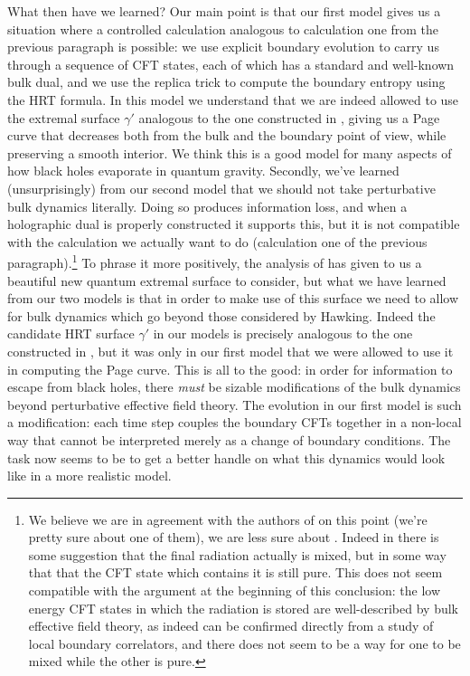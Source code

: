 \documentclass[12pt]{article}
\theoremstyle{definition}
\begin{document}
What then have we learned?  Our main point is that our first model gives us a situation where a controlled calculation analogous to calculation one from the previous paragraph is possible: we use explicit boundary evolution to carry us through a sequence of CFT states, each of which has a standard and well-known bulk dual, and we use the replica trick to compute the boundary entropy using the HRT formula.  In this model we understand that we are indeed allowed to use the extremal surface $\gamma'$ analogous to the one constructed in \cite{Almheiri:2019psf,Penington:2019npb}, giving us a Page curve that decreases both from the bulk and the boundary point of view, while preserving a smooth interior. We think this is a good model for many aspects of how black holes evaporate in quantum gravity.   Secondly, we've learned (unsurprisingly) from our second model that we should not take perturbative bulk dynamics literally.  Doing so produces information loss, and when a holographic dual is properly constructed it supports this, but it is not compatible with the calculation we actually want to do (calculation one of the previous paragraph).\footnote{We believe we are in agreement with the authors of \cite{Almheiri:2019psf} on this point (we're pretty sure about one of them), we are less sure about \cite{Penington:2019npb}.  Indeed in \cite{Penington:2019npb} there is some suggestion that the final radiation actually is mixed, but in some way that that the CFT state which contains it is still pure.  This does not seem compatible with the argument at the beginning of this conclusion: the low energy CFT states in which the radiation is stored are well-described by bulk effective field theory, as indeed can be confirmed directly from a study of local boundary correlators, and there does not seem to be a way for one to be mixed while the other is pure.}  To phrase it more positively, the analysis of \cite{Almheiri:2019psf,Penington:2019npb,Almheiri:2019hni} has given to us a beautiful new quantum extremal surface to consider, but what we have learned from our two models is that in order to make use of this surface we need to allow for bulk dynamics which go beyond those considered by Hawking.  Indeed the candidate HRT surface $\gamma'$ in our models is precisely analogous to the one constructed in \cite{Almheiri:2019psf,Penington:2019npb,Almheiri:2019hni}, but it was only in our first model that we were allowed to use it in computing the Page curve.  This is all to the good: in order for information to escape from black holes, there \textit{must} be sizable modifications of the bulk dynamics beyond perturbative effective field theory.  The evolution in our first model is such a modification: each time step couples the boundary CFTs together in a non-local way that cannot be interpreted merely as a change of boundary conditions.  The task now seems to be to get a better handle on what this dynamics would look like in a more realistic model. 
\end{document}
